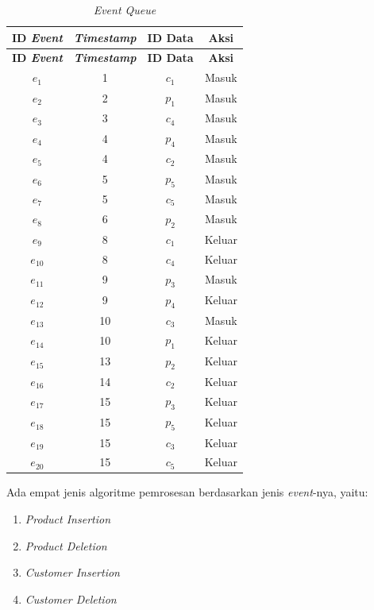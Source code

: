 \begin{small}
	\begin{longtable}{|c|c|c|c|}
		\caption{\textit{Event Queue} \label{tab:event-queue}}
		\hline
		\multicolumn{1}{|c|}{\textbf{ID \textit{Event}}} & \multicolumn{1}{c|}{\textbf{\textit{Timestamp}}} & \multicolumn{1}{c}{\textbf{ID Data}} & \multicolumn{1}{|c|}{\textbf{Aksi}} \\ \hline 
		\endfirsthead
		\hline
		\multicolumn{1}{|c|}{\textbf{ID \textit{Event}}} & \multicolumn{1}{c|}{\textbf{\textit{Timestamp}}} & \multicolumn{1}{c}{\textbf{ID Data}} & \multicolumn{1}{|c|}{\textbf{Aksi}} \\ \hline
		\endhead
		$e_1$ & 1 & $c_1$ & Masuk \\ \hline
		$e_2$ & 2 & $p_1$ & Masuk \\ \hline
		$e_3$ & 3 & $c_4$ & Masuk \\ \hline
		$e_4$ & 4 & $p_4$ & Masuk \\ \hline
		$e_5$ & 4 & $c_2$ & Masuk \\ \hline
		$e_6$ & 5 & $p_5$ & Masuk \\ \hline
		$e_7$ & 5 & $c_5$ & Masuk \\ \hline
		$e_8$ & 6 & $p_2$ & Masuk \\ \hline
		$e_9$ & 8 & $c_1$ & Keluar \\ \hline
		$e_{10}$ & 8 & $c_4$ & Keluar \\ \hline
		$e_{11}$ & 9 & $p_3$ & Masuk \\ \hline
		$e_{12}$ & 9 & $p_4$ & Keluar \\ \hline
		$e_{13}$ & 10 & $c_3$ & Masuk \\ \hline
		$e_{14}$ & 10 & $p_1$ & Keluar \\ \hline
		$e_{15}$ & 13 & $p_2$ & Keluar \\ \hline
		$e_{16}$ & 14 & $c_2$ & Keluar \\ \hline
		$e_{17}$ & 15 & $p_3$ & Keluar \\ \hline
		$e_{18}$ & 15 & $p_5$ & Keluar \\ \hline
		$e_{19}$ & 15 & $c_3$ & Keluar \\ \hline
		$e_{20}$ & 15 & $c_5$ & Keluar \\ \hline
	\end{longtable}
\end{small}

Ada empat jenis algoritme pemrosesan berdasarkan jenis \textit{event}-nya, yaitu:

\begin{enumerate}
	\item \textit{Product Insertion}
	\item \textit{Product Deletion}
	\item \textit{Customer Insertion}
	\item \textit{Customer Deletion}
\end{enumerate}

